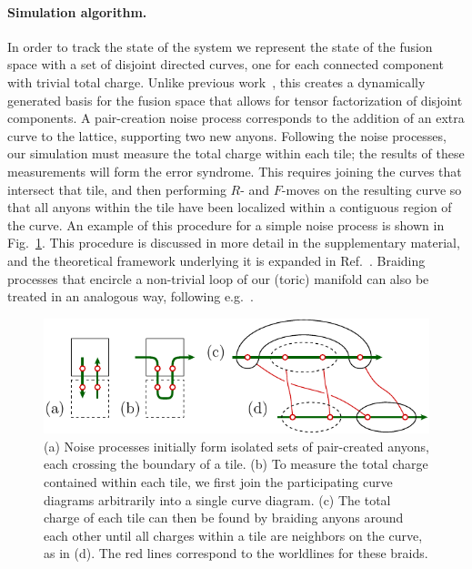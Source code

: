 \documentclass[aps, prl, letterpaper, twocolumn, superscriptaddress, notitlepage, 10pt]{revtex4-1}
\newcommand{\Fref}[1]{Fig.~\ref{#1}}
\begin{document}
\paragraph{Simulation algorithm.}

In order to track the state of the system we represent the state of the fusion space with 
a set of disjoint directed curves, 
one for each connected component with trivial total charge.
Unlike previous work~\cite{Brell2013}, this creates a dynamically generated basis for the fusion space 
that allows for tensor factorization of disjoint components.
A pair-creation noise process corresponds to the 
addition of an extra curve to the lattice, supporting
two new anyons.
Following the noise processes, our simulation must 
measure the total charge within each tile; the results of 
these measurements will form the error syndrome. 
This requires joining the curves that intersect that tile, 
and then performing $R$- and $F$-moves on the resulting
curve so that 
all anyons within the tile have been 
localized within a contiguous region of the curve. 
An example of this 
procedure for a simple noise process is shown in \Fref{f:syndrome}.
This procedure is discussed in more detail in the supplementary material, and the theoretical framework underlying it is expanded in Ref.~\cite{CurveDiagrams}.
Braiding processes that encircle 
a non-trivial loop of our (toric) manifold can also be 
treated in an analogous way, following e.g.~\cite{Pfeifer2012}.

\begin{figure}[t!]
\begin{center}
	\includegraphics[width=1.0\columnwidth]{pic-syndrome.pdf}
\caption{
(a) Noise processes initially form isolated sets of pair-created anyons, 
each crossing the boundary of a tile. 
(b) To measure the total charge 
contained within each tile, 
we first join the participating curve 
diagrams arbitrarily into a single curve diagram.
(c) The total charge of each tile can then be found 
by braiding anyons around each other until all charges within 
a tile are neighbors on the curve, as in (d).  
The red lines correspond to the worldlines for these braids.
}
\label{f:syndrome}
\end{center}
\vspace{-10pt}
\end{figure}
\end{document}
